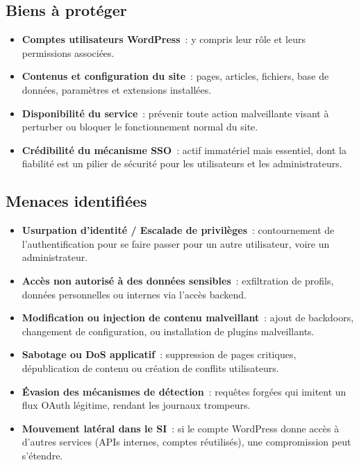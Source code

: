\documentclass[a4paper,12pt]{article}
\begin{document}
\subsection*{Biens à protéger}
\begin{itemize}
  \item \textbf{Comptes utilisateurs WordPress}~: y compris leur rôle et leurs permissions associées.
  \item \textbf{Contenus et configuration du site}~: pages, articles, fichiers, base de données, paramètres et extensions installées.
  \item \textbf{Disponibilité du service}~: prévenir toute action malveillante visant à perturber ou bloquer le fonctionnement normal du site.
  \item \textbf{Crédibilité du mécanisme SSO}~: actif immatériel mais essentiel, dont la fiabilité est un pilier de sécurité pour les utilisateurs et les administrateurs.
\end{itemize}

\subsection*{Menaces identifiées}
\begin{itemize}
  \item \textbf{Usurpation d’identité / Escalade de privilèges}~: contournement de l’authentification pour se faire passer pour un autre utilisateur, voire un administrateur.
  \item \textbf{Accès non autorisé à des données sensibles}~: exfiltration de profils, données personnelles ou internes via l’accès backend.
  \item \textbf{Modification ou injection de contenu malveillant}~: ajout de backdoors, changement de configuration, ou installation de plugins malveillants.
  \item \textbf{Sabotage ou DoS applicatif}~: suppression de pages critiques, dépublication de contenu ou création de conflits utilisateurs.
  \item \textbf{Évasion des mécanismes de détection}~: requêtes forgées qui imitent un flux OAuth légitime, rendant les journaux trompeurs.
  \item \textbf{Mouvement latéral dans le SI}~: si le compte WordPress donne accès à d'autres services (APIs internes, comptes réutilisés), une compromission peut s'étendre.
\end{itemize}
\end{document}
